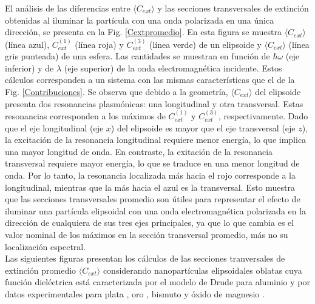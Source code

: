 El análisis de las diferencias entre $\langle C_{ext}\rangle$ y  las secciones transversales de extinción obtenidas al iluminar la partícula con una onda polarizada en una única dirección, se presenta en la Fig. \ref{Cextpromedio}. En esta figura se muestra $\langle C_{ext}\rangle$ (línea azul), $C_{ext}^{(1)}$ (línea roja) y $C_{ext}^{(3)}$ (línea verde) de un elipsoide y  $\langle C_{ext}\rangle$ (línea gris punteada) de una esfera. Las cantidades se muestran en función de $\hbar\omega$ (eje inferior) y de $\lambda$ (eje superior) de la onda electromagnética incidente. Estos cálculos corresponden a un sistema con las mismas características que el de la Fig. \ref{Contribuciones}. Se observa que debido a la geometría,
$\langle C_{ext}\rangle$ del elipsoide presenta dos resonancias plasmónicas: una longitudinal y otra transversal. Estas resonancias corresponden a los máximos de $C_{ext}^{(1)}$ y $C_{ext}^{(3)}$, respectivamente. Dado que el eje longitudinal (eje $x$) del elipsoide es mayor que el eje transversal (eje $z$), la excitación de la resonancia longitudinal requiere menor energía, lo que implica una mayor longitud de onda. En contraste, la exitación de la resonancia transversal requiere mayor energía, lo que se traduce en una menor longitud de onda. Por lo tanto, la resonancia localizada más hacia el rojo corresponde a la longitudinal, mientras que la más hacia el azul es la transversal. Esto muestra que las secciones transversales promedio son útiles para representar el efecto de iluminar una partícula elipsoidal con una onda electromagnética polarizada en la dirección de cualquiera de sus tres ejes principales, ya que lo que cambia es el valor nominal de los máximos en la sección transversal promedio, más no su localización espectral. \\

Las siguientes figuras presentan los cálculos de las secciones tranversales de extinción promedio  $\langle C_{ext}\rangle$ considerando nanopartículas elipsoidales oblatas cuya función dieléctrica está caracterizada por el modelo de Drude para aluminio \cite{Aluminio} y por datos experimentales para plata \cite{Plata}, oro \cite{Plata}, bismuto \cite{Bismuto} y  óxido de magnesio \cite{MgO}.


